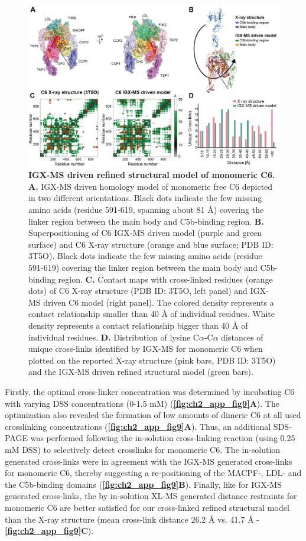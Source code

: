 \begin{figure}[h]
	\center
	\includegraphics[]{Chapter.2/Figures/Figure6.png}
	\caption{\textbf{IGX-MS driven refined structural model of monomeric C6.} \textbf{A.} IGX-MS driven homology model of monomeric free C6 depicted in two different orientations. Black dots indicate the few missing amino acids (residue 591-619, spanning about 81 Å) covering the linker region between the main body and C5b-binding region. \textbf{B.} Superpositioning of C6 IGX-MS driven model (purple and green surface) and C6 X-ray structure (orange and blue surface; PDB ID: 3T5O). Black dots indicate the few missing amino acids (residue 591-619) covering the linker region between the main body and C5b-binding region. \textbf{C.} Contact maps with cross-linked residues (orange dots) of C6 X-ray structure (PDB ID: 3T5O, left panel) and IGX-MS driven C6 model (right panel). The colored density represents a contact relationship smaller than 40 Å of individual residues. White density represents a contact relationship bigger than 40 Å of individual residues. \textbf{D.} Distribution of lysine C$\alpha$-C$\alpha$ distances of unique cross-links identified by IGX-MS for monomeric C6 when plotted on the reported X-ray structure (pink bars, PDB ID: 3T5O) and the IGX-MS driven refined structural model (green bars).}
	\label{fig:ch2_fig6}
\end{figure}
Firstly, the optimal cross-linker concentration was determined by incubating C6 with varying DSS concentrations (0-1.5 mM) (\textbf{\autoref{fig:ch2_app_fig9}A}). The optimization also revealed the formation of low amounts of dimeric C6 at all used crosslinking concentrations (\textbf{\autoref{fig:ch2_app_fig9}A}). Thus, an additional SDS-PAGE was performed following the in-solution cross-linking reaction (using 0.25 mM DSS) to selectively detect crosslinks for monomeric C6. The in-solution generated cross-links were in agreement with the IGX-MS generated cross-links for monomeric C6, thereby suggesting a re-positioning of the MACPF-, LDL- and the C5b-binding domains (\textbf{\autoref{fig:ch2_app_fig9}B}). Finally, like for IGX-MS generated cross-links, the by in-solution XL-MS generated distance restraints for monomeric C6 are better satisfied for our cross-linked refined structural model than the X-ray structure (mean cross-link distance 26.2 Å vs. 41.7 Å - \textbf{\autoref{fig:ch2_app_fig9}C}).
%

